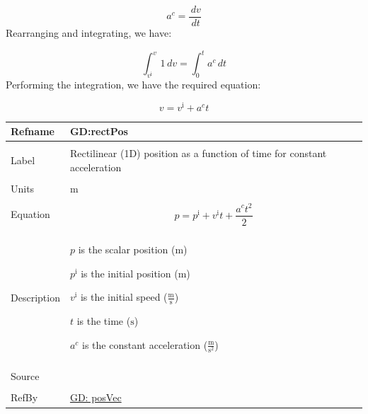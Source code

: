 \documentclass[12pt]{article}
\begin{document}
\begin{displaymath}
{a^{c}}=\frac{\,dv}{\,dt}
\end{displaymath}
Rearranging and integrating, we have:

\begin{displaymath}
\int_{{v^{\text{i}}}}^{v}{1}\,dv=\int_{0}^{t}{{a^{c}}}\,dt
\end{displaymath}
Performing the integration, we have the required equation:

\begin{displaymath}
v={v^{\text{i}}}+{a^{c}} t
\end{displaymath}
\vspace{\baselineskip}
\noindent
\begin{minipage}{\textwidth}
\begin{tabular}{>{\raggedright}p{}>{\raggedright\arraybackslash}p{}}
\toprule \textbf{Refname} & \textbf{GD:rectPos}
\label{GD:rectPos}
\\ \midrule \\
Label & Rectilinear (1D) position as a function of time for constant acceleration
        
\\ \midrule \\
Units & ${\text{m}}$
        
\\ \midrule \\
Equation & \begin{displaymath}
           p={p^{\text{i}}}+{v^{\text{i}}} t+\frac{{a^{c}} t^{2}}{2}
           \end{displaymath}
\\ \midrule \\
Description & \begin{symbDescription}
              \item{$p$ is the scalar position (${\text{m}}$)}
              \item{${p^{\text{i}}}$ is the initial position (${\text{m}}$)}
              \item{${v^{\text{i}}}$ is the initial speed ($\frac{\text{m}}{\text{s}}$)}
              \item{$t$ is the time (${\text{s}}$)}
              \item{${a^{c}}$ is the constant acceleration ($\frac{\text{m}}{\text{s}^{2}}$)}
              \end{symbDescription}
\\ \midrule \\
Source & \cite[(pg. 8)]{hibbeler2004}
         
\\ \midrule \\
RefBy & \hyperref[GD:posVec]{GD: posVec}
        
\\ \bottomrule
\end{tabular}
\end{minipage}
\end{document}
